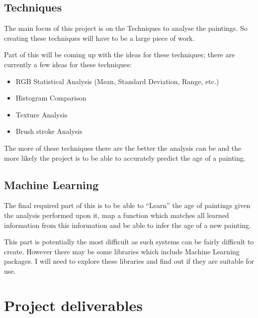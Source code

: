 \documentclass[11pt,fleqn,twoside]{article}
\begin{document}
\subsection{Techniques}
The main focus of this project is on the Techniques to analyse the paintings. So creating these techniques will have to be a large piece of work.

Part of this will be coming up with the ideas for these techniques; there are currently a few ideas for these techniques:

\begin{itemize}
\item RGB Statistical Analysis (Mean, Standard Deviation, Range, etc.)
\item Histogram Comparison
\item Texture Analysis
\item Brush stroke Analysis
\end{itemize}

The more of these techniques there are the better the analysis can be and the more likely the project is to be able to accurately predict the age of a painting.


\subsection{Machine Learning}
The final required part of this is to be able to ``Learn'' the age of paintings given the analysis performed upon it, map a function which matches all learned information from this information and be able to infer the age of a new painting.

This part is potentially the most difficult as such systems can be fairly difficult to create. However there may be some libraries which include Machine Learning packages. I will need to explore these libraries and find out if they are suitable for use.


\section{Project deliverables}
\end{document}
